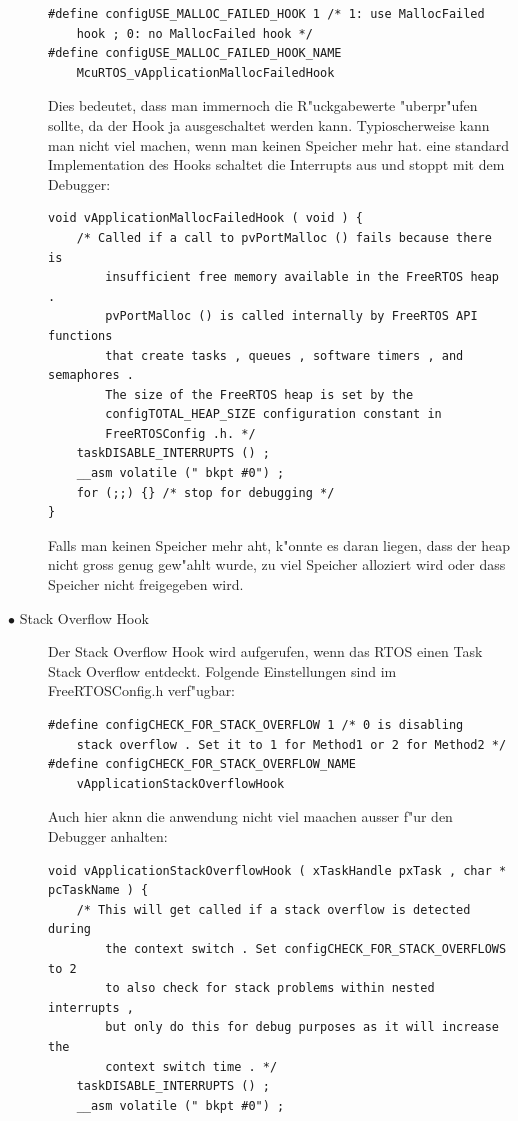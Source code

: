 \documentclass[a4paper, 8pt]{extarticle}
\begin{document}
\begin{multicols*}{3}
\begin{description}
						\begin{lstlisting}
#define configUSE_MALLOC_FAILED_HOOK 1 /* 1: use MallocFailed
	hook ; 0: no MallocFailed hook */
#define configUSE_MALLOC_FAILED_HOOK_NAME
	McuRTOS_vApplicationMallocFailedHook
						\end{lstlisting}
						Dies bedeutet, dass man immernoch die R"uckgabewerte "uberpr"ufen sollte, da der Hook ja ausgeschaltet werden kann. Typioscherweise
						kann man nicht viel machen, wenn man keinen Speicher mehr hat. eine standard Implementation des Hooks schaltet die Interrupts aus und stoppt 
						mit dem Debugger:
						\begin{lstlisting}
void vApplicationMallocFailedHook ( void ) {
	/* Called if a call to pvPortMalloc () fails because there is
		insufficient free memory available in the FreeRTOS heap .
		pvPortMalloc () is called internally by FreeRTOS API functions
		that create tasks , queues , software timers , and semaphores .
		The size of the FreeRTOS heap is set by the
		configTOTAL_HEAP_SIZE configuration constant in
		FreeRTOSConfig .h. */
	taskDISABLE_INTERRUPTS () ;
	__asm volatile (" bkpt #0") ;
	for (;;) {} /* stop for debugging */
}
						\end{lstlisting} 
						Falls man keinen Speicher mehr aht, k"onnte es daran liegen, dass der heap nicht gross genug gew"ahlt wurde, zu viel Speicher alloziert
						wird oder dass Speicher nicht freigegeben wird.
					\item[$\bullet$ Stack Overflow Hook]
						Der Stack Overflow Hook wird aufgerufen, wenn das RTOS einen Task Stack Overflow entdeckt. Folgende Einstellungen sind im 
						FreeRTOSConfig.h verf"ugbar:
						\begin{lstlisting}
#define configCHECK_FOR_STACK_OVERFLOW 1 /* 0 is disabling
	stack overflow . Set it to 1 for Method1 or 2 for Method2 */
#define configCHECK_FOR_STACK_OVERFLOW_NAME
	vApplicationStackOverflowHook
						\end{lstlisting} 
						Auch hier aknn die anwendung nicht viel maachen ausser f"ur den Debugger anhalten:
						\begin{lstlisting}
void vApplicationStackOverflowHook ( xTaskHandle pxTask , char *
pcTaskName ) {
	/* This will get called if a stack overflow is detected during
		the context switch . Set configCHECK_FOR_STACK_OVERFLOWS to 2
		to also check for stack problems within nested interrupts ,
		but only do this for debug purposes as it will increase the
		context switch time . */
	taskDISABLE_INTERRUPTS () ;
	__asm volatile (" bkpt #0") ;

\end{lstlisting}
\end{description}
\end{multicols*}
\end{document}
